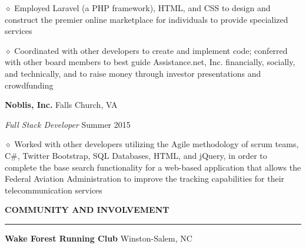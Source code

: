 \documentclass[executivepaper]{extarticle}
\begin{document}
\begin{center}
{\begin{minipage}{7.0in}
{\noindent $\diamond$ {\fontsize{12}{8}\selectfont Employed Laravel (a PHP framework), HTML, and CSS to design and construct the premier online marketplace for individuals to provide specialized services}}

\vspace{0.25mm}

{\noindent $\diamond$ {\fontsize{12}{8}\selectfont Coordinated with other developers to create and implement code; conferred with other board members to best guide Assistance.net, Inc. financially, socially, and technically,
and to raise money through investor presentations and crowdfunding}}

\vspace{2mm}

{\noindent \textbf{\fontsize{12}{8}\selectfont Noblis, Inc.}} {\hfill \fontsize{10}{8}\selectfont Falls Church, VA}

\vspace{0.25mm}

{\noindent \textit{\fontsize{12}{8}\selectfont Full Stack Developer}} {\hfill \fontsize{10}{8}\selectfont Summer 2015}

\vspace{0.25mm}

{\noindent $\diamond$ {\fontsize{12}{8}\selectfont Worked with other developers utilizing the Agile methodology of scrum teams, C\#, Twitter Bootstrap, SQL Databases, HTML, and jQuery, in order to complete
the base search functionality for a web-based application that allows the Federal Aviation Administration to improve the tracking capabilities for their telecommunication services}}

\vspace{3mm}


{\noindent \textbf{\fontsize{12}{9}\selectfont COMMUNITY AND INVOLVEMENT}}

\vspace{-3mm}

\noindent \rule{\textwidth}{0.5pt}

\vspace{0.5mm}

{\noindent \textbf{\fontsize{12}{8}\selectfont Wake Forest Running Club}} {\hfill \fontsize{10}{8}\selectfont Winston-Salem, NC}

\vspace{0.25mm}


\end{minipage}}
\end{center}
\end{document}
